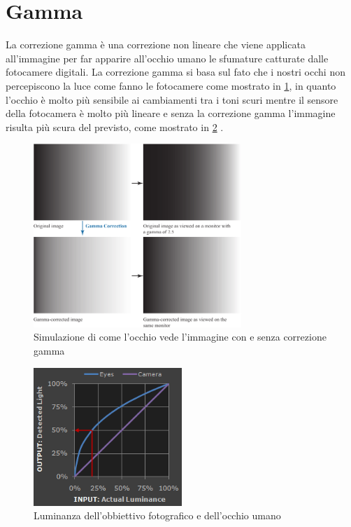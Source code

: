 \section{Gamma}\label{gamma}

La correzione gamma è una correzione non lineare che viene applicata all'immagine per far apparire all'occhio umano le sfumature catturate dalle fotocamere digitali. La correzione gamma si basa sul fato che i nostri occhi non percepiscono la luce come fanno le fotocamere come mostrato in \cref{fig:gamma-correction}, in quanto l'occhio è molto più sensibile ai cambiamenti tra i toni scuri mentre il sensore della fotocamera è molto più lineare e senza la correzione gamma l'immagine risulta più scura del previsto, come mostrato in \cref{fig:gamma} \cite{gamma} \cite{gonzalez_dip}. 

\begin{figure}[ht]
    \centering
    \includegraphics[width=0.7\textwidth]{preprocessing/gamma-correction.pdf}
    \caption{Simulazione di come l'occhio vede l'immagine con e senza correzione gamma}
    \label{fig:gamma-correction}
\end{figure}


\begin{figure}[ht]
    \centering
    \includegraphics[width=0.5\textwidth]{preprocessing/gamma.png}
    \caption{Luminanza dell'obbiettivo fotografico e dell'occhio umano}
    \label{fig:gamma}
\end{figure}

